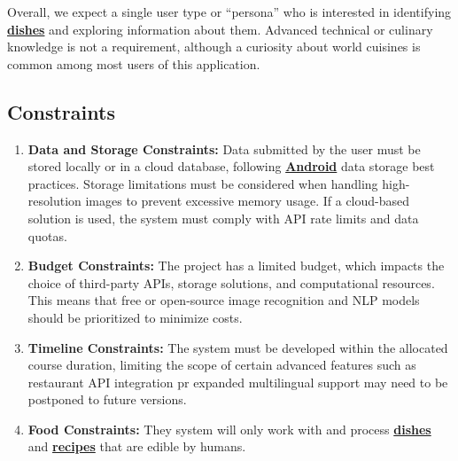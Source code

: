 \documentclass[]{article}
\begin{document}
Overall, we expect a single user type or “persona” who is interested in identifying \hyperref[Dish]{\textbf{dishes}} and exploring information about them. Advanced technical or culinary knowledge is not a requirement, although a curiosity about world cuisines is common among most users of this application.

\subsection{Constraints}
\label{sub:constraints}
\begin{enumerate}
	\item \textbf{Data and Storage Constraints: }Data submitted by the user must be stored locally or in a cloud database, following \hyperref[Android]{\textbf{Android}} data storage best practices. Storage limitations must be considered when handling high-resolution images to prevent excessive memory usage. If a cloud-based solution is used, the system must comply with API rate limits and data quotas.
	\item \textbf{Budget Constraints: }The project has a limited budget, which impacts the choice of third-party APIs, storage solutions, and computational resources. This means that free or open-source image recognition and NLP models should be prioritized to minimize costs.
	\item \textbf{Timeline Constraints: }The system must be developed within the allocated course duration, limiting the scope of certain advanced features such as restaurant API integration pr expanded multilingual support may need to be postponed to future versions.
	\item \textbf{Food Constraints: } They system will only work with and process \hyperref[Dish]{\textbf{dishes}} and \hyperref[Recipe]{\textbf{recipes}} that are edible by humans.
\end{enumerate}
\end{document}
